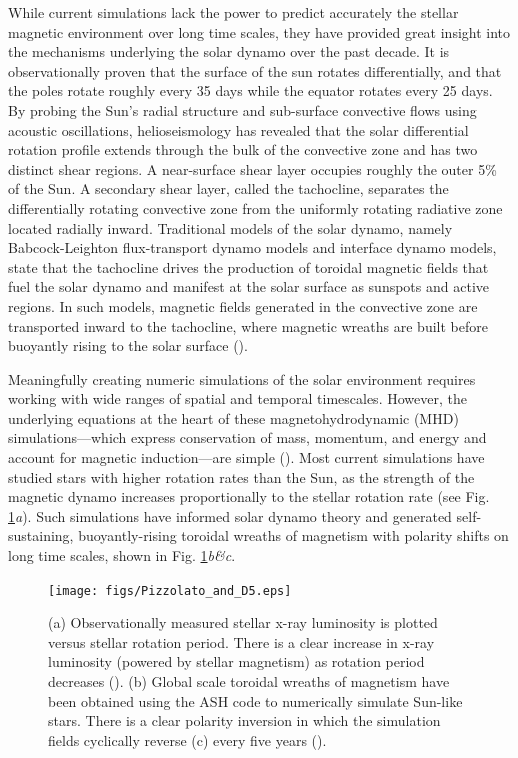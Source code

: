 \documentclass[aasms,12pt]{article}
\begin{document}
While current simulations lack the power to predict accurately 
the stellar magnetic environment 
over long time scales, they have provided great insight into the mechanisms
underlying the solar dynamo over the past decade.  
It is observationally proven that the surface of the sun rotates differentially,
and that the poles rotate roughly every 35 days while the equator rotates every 25
days.  By probing the Sun's
radial structure and sub-surface convective flows using acoustic oscillations,
helioseismology
has revealed that the solar differential rotation profile extends through the
bulk of the convective zone and has two distinct shear regions.  A near-surface
shear layer occupies roughly the outer 5\% of the Sun. A secondary shear
layer, called the tachocline, 
separates the differentially rotating convective zone from the uniformly
rotating radiative zone located radially inward.  
Traditional models of the solar dynamo, namely Babcock-Leighton flux-transport
dynamo models and interface dynamo models, state that the
tachocline drives the production of toroidal magnetic   
fields that fuel the solar dynamo and manifest at the solar surface as
sunspots and active regions.  In such models, magnetic fields generated
in the convective zone are transported inward to the tachocline, where
magnetic wreaths are built before buoyantly 
rising to the solar surface (\citealt{Toomre2009}).

Meaningfully creating numeric simulations of the 
solar environment requires working with wide ranges
of spatial and temporal timescales.  However, the
underlying equations at the heart of these magnetohydrodynamic (MHD) 
simulations---which express conservation of mass, momentum, and energy and
account for magnetic induction---are simple (\citealt{Charbonneau2014}).  Most current
simulations
have studied stars with higher rotation rates than the Sun, as the strength
of the magnetic dynamo increases proportionally to the stellar
rotation rate (see Fig.
\ref{wreaths}\emph{a}).  Such simulations
have informed solar dynamo theory and generated 
self-sustaining, buoyantly-rising toroidal wreaths of magnetism with polarity
shifts on long time scales,
shown in Fig. \ref{wreaths}\emph{b\&c}.  

\begin{figure}[t!]
\centering
\texttt{[image: figs/Pizzolato\_and\_D5.eps]}
\caption{(a) Observationally measured stellar
        x-ray luminosity is plotted versus stellar rotation period.  There is a 
	clear increase in x-ray luminosity (powered by stellar magnetism) 
	as rotation
        period decreases (\citealt{Pizzolato2003}).  (b) Global scale toroidal 
	wreaths of magnetism have been obtained using the ASH code to numerically
	simulate Sun-like stars.  There is a clear polarity inversion in which the
	simulation fields cyclically reverse (c) every five years
        (\citealt{Brown2011}).
        \label{wreaths}}
\end{figure}
\end{document}
